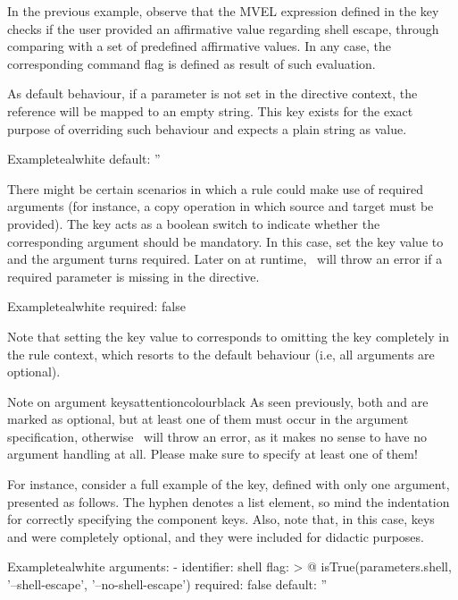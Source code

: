 \begin{description}
\begin{description}
In the previous example, observe that the MVEL expression defined in the  key checks if the user provided an affirmative value regarding shell escape, through comparing  with a set of predefined affirmative values. In any case, the corresponding command flag is defined as result of such evaluation.

\item[\describecontext{O}{arguments}{default}] As default behaviour, if a parameter is not set in the directive context, the reference will be mapped to an empty string. This key exists for the exact purpose of overriding such behaviour and expects a plain string as value.

\begin{codebox}{Example}{teal}{\icnote}{white}
default: ''
\end{codebox}

\item[\describecontext{O}{arguments}{required}] There might be certain scenarios in which a rule could make use of required arguments (for instance, a copy operation in which source and target must be provided). The  key acts as a boolean switch to indicate whether the corresponding argument should be mandatory. In this case, set the key value to  and the argument turns required. Later on at runtime, \arara\ will throw an error if a required parameter is missing in the directive.

\begin{codebox}{Example}{teal}{\icnote}{white}
required: false
\end{codebox}

Note that setting the  key value to  corresponds to omitting the key completely in the rule context, which resorts to the default behaviour (i.e, all arguments are optional).
\end{description}

\begin{messagebox}{Note on argument keys}{attentioncolour}{\icattention}{black}
As seen previously, both  and  are marked as optional, but at least one of them must occur in the argument specification, otherwise \arara\ will throw an error, as it makes no sense to have no argument handling at all. Please make sure to specify at least one of them!
\end{messagebox}

For instance, consider a full example of the  key, defined with only one argument, presented as follows. The hyphen denotes a list element, so mind the indentation for correctly specifying the component keys. Also, note that, in this case, keys  and  were completely optional, and they were included for didactic purposes.

\begin{codebox}{Example}{teal}{\icnote}{white}
arguments:
- identifier: shell
  flag: >
    @{
        isTrue(parameters.shell, '--shell-escape',
               '--no-shell-escape')
    }
  required: false
  default: ''
\end{codebox}
\end{description}

